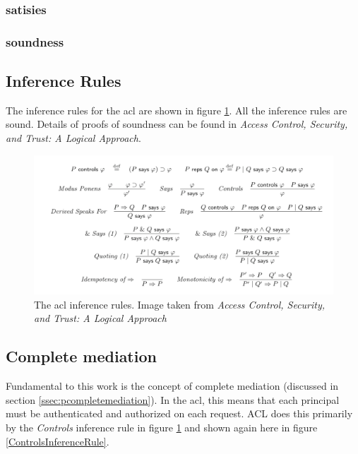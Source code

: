 \documentclass[../../main/main.tex]{subfiles}
\begin{document}
\subsubsection{satisies}\label{sssec:satisfies}
\subsubsection{soundness}\label{sssec:soundness}

\subsection{Inference Rules}\label{ssec:inferencerules}
The inference rules for the \gls{acl} are shown in figure \ref{inferencerules}.  All the inference rules are sound.  Details of proofs of soundness can be found in \textit{Access Control, Security, and Trust: A Logical Approach}\cite{ChinOlder}.

\begin{figure}[h]
\centering
\includegraphics[width=\textwidth]{../figures/inferencerules}
\caption{\label{inferencerules}The \gls{acl} inference rules. Image taken from \textit{Access Control, Security, and Trust: A Logical Approach}\cite{ChinOlder}}
\end{figure}

\subsection{Complete mediation}\label{ssec:aclcompletemediation}
Fundamental to this work is the concept of complete mediation (discussed in section \ref{ssec:pcompletemediation}).  In the \gls{acl}, this means that each principal must be authenticated and authorized on each request.   ACL does this primarily by the \textit{Controls} inference rule in figure \ref{inferencerules} and shown again here in figure \ref{ControlsInferenceRule}. 
\end{document}
